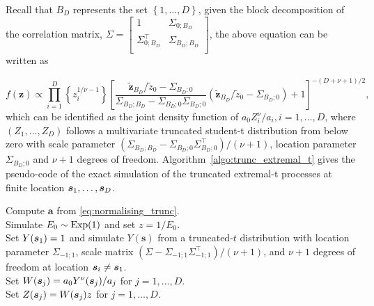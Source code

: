 \documentclass[12pt]{article}
\begin{document}
Recall that $B_D$ represents the set $\left\{ 1, \ldots, D\right\}$, given the block decomposition of the correlation matrix, $\Sigma = \begin{bmatrix}
	1 & \Sigma_{0;B_D} \\
	\Sigma_{0;B_D}^\top & \Sigma_{B_D;B_D} \\
\end{bmatrix}$, 
the above equation can be written as

\begin{equation*}
    f(\bm z) \propto \prod_{i=1}^D \left\{z_i^{1/\nu-1}\right\} 
    \left[ \frac{\tilde{\bm z}_{B_D}/\tilde{z}_0 - \Sigma_{B_D;0}}{\Sigma_{B_D;B_D} - \Sigma_{B_D;0}\Sigma_{B_D;0}}
    \left(\tilde{\bm z}_{B_D}/\tilde{z}_0 - \Sigma_{B_D;0}\right) + 1 \right]^{-(D+\nu+1)/2},    
\end{equation*}
which can be identified as the joint density function of $a_0 Z_i^\nu/a_i,i=1,\dots,D$, where $(Z_1,\dots,Z_D)$ follows a multivariate truncated student-t distribution from below zero with scale parameter $(\Sigma_{B_D;B_D} - \Sigma_{B_D;0} \Sigma_{B_D;0}^\top) / (\nu+1)$, location parameter $\Sigma_{B_D;0}$ and $\nu+1$ degrees of freedom. Algorithm~\ref{algo:trunc_extremal_t} gives the pseudo-code of the exact simulation of the truncated extremal-t processes at finite location ${\boldsymbol{s}}_1,\dots,{\boldsymbol{s}}_D$.

\begin{algorithm}
\caption{Exact simulation of truncated extremal-t processes at locations $\bm s = (\bs_1,\dots,\bs_D)$.}
\label{algo:trunc_extremal_t}
Compute $\bm a$ from  \eqref{eq:normalising_trunc}. \\
Simulate $E_0 \sim \rm{Exp}(1)$ and set $z=1/E_0$. \\ 
Set $Y({\boldsymbol{s}}_1)=1$ and simulate $Y(\bm s)$ from a truncated-$t$ distribution with location parameter $\Sigma_{-1;1}$, scale matrix $(\Sigma - \Sigma_{-1;1}\Sigma_{-1;1}^\top)/(\nu+1)$, and $\nu+1$ degrees of freedom at location ${\boldsymbol{s}}_i\neq {\boldsymbol{s}}_1$.\\ 
Set $W({\boldsymbol{s}}_j) = a_0 Y^{\nu}({\boldsymbol{s}}_j)/a_j$ for $j=1,\dots,D$. \\
Set $Z({\boldsymbol{s}}_j) = W({\boldsymbol{s}}_j)z$ for $j=1,\dots,D$. \\
\end{algorithm}
\end{document}
